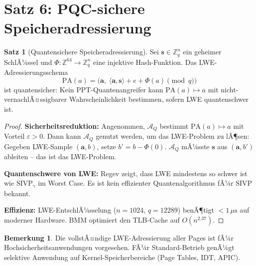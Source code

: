 ﻿\documentclass[a4paper,12pt]{scrreprt}
\theoremstyle{definition}
\newtheorem{satz}{Satz}[chapter]
\newtheorem{bemerkung}{Bemerkung}[chapter]
\begin{document}
	\section{Satz 6: PQC-sichere Speicheradressierung}
	
	\begin{satz}[Quantensichere Speicheradressierung]\label{satz:pqc_mem}
		Sei $\mathbf{s} \in \mathbb{Z}_q^n$ ein geheimer SchlÃ¼ssel und
		$\Phi: \mathbb{Z}^{64} \to \mathbb{Z}_q^n$ eine injektive Hash-Funktion.
		Das LWE-Adressierungsschema
		\[
		\mathrm{PA}(a) = \bigl(\mathbf{a},\; \langle \mathbf{a}, \mathbf{s} \rangle
		+ e + \Phi(a) \pmod{q}\bigr)
		\]
		ist quantensicher: Kein PPT-Quantenangreifer kann $\mathrm{PA}(a) \mapsto a$
		mit nicht-vernachlÃ¤ssigbarer Wahrscheinlichkeit bestimmen, sofern LWE
		quantenschwer ist.
	\end{satz}
	
	\begin{proof}
		\textbf{Sicherheitsreduktion:} Angenommen, $\mathcal{A}_Q$ bestimmt
		$\mathrm{PA}(a) \mapsto a$ mit Vorteil $\varepsilon > 0$. Dann kann
		$\mathcal{A}_Q$ genutzt werden, um das LWE-Problem zu lÃ¶sen: Gegeben
		LWE-Sample $(\mathbf{a}, b)$, setze $b' = b - \Phi(0)$.
		$\mathcal{A}_Q$ mÃ¼sste $\mathbf{s}$ aus $(\mathbf{a}, b')$ ableiten --
		das ist das LWE-Problem.
		
		\textbf{Quantenschwere von LWE:} Regev \cite{Regev2009} zeigt, dass
		LWE mindestens so schwer ist wie $\mathrm{SIVP}_\gamma$ im Worst Case.
		Es ist kein effizienter Quantenalgorithmus fÃ¼r $\mathrm{SIVP}$ bekannt.
		
		\textbf{Effizienz:} LWE-EntschlÃ¼sselung ($n = 1024$, $q = 12289$)
		benÃ¶tigt $< 1\,\mu\text{s}$ auf moderner Hardware. BMM \cite{Epp2026boolmm}
		optimiert den TLB-Cache auf $O(n^{2.37})$.
	\end{proof}
	
	\begin{bemerkung}
		Die vollstÃ¤ndige LWE-Adressierung aller Pages ist fÃ¼r
		Hochsicherheitsanwendungen vorgesehen. FÃ¼r Standard-Betrieb genÃ¼gt
		selektive Anwendung auf Kernel-Speicherbereiche (Page Tables, IDT, APIC).
	\end{bemerkung}
	
	
\end{document}
